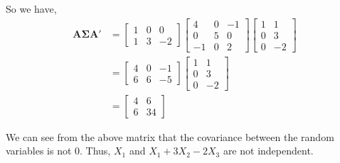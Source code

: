 \documentclass[12pt]{article}\usepackage[]{graphicx}\usepackage[]{color}
\newenvironment{problem}[2][Problem]{\begin{trivlist}
\item[\hskip \labelsep {\bfseries #1}\hskip \labelsep {\bfseries #2.}]}{\end{trivlist}}
\newcommand{\vct}{\mathbf}
\begin{document}
\begin{enumerate}[a)]
So we have,
\begin{align*}
\vct{A}\vct{\Sigma}\vct{A}' &= \begin{bmatrix} 1 & 0 & 0 \\ 1 & 3 & -2\end{bmatrix} \begin{bmatrix} 4 & 0 & -1 \\ 0 & 5 & 0 \\ -1 & 0 & 2 \end{bmatrix} \begin{bmatrix} 1 & 1 \\ 0 & 3 \\ 0 & -2\end{bmatrix}\\
&= \begin{bmatrix} 4 & 0 & -1 \\ 6 & 6 & -5\end{bmatrix} \begin{bmatrix} 1 & 1 \\ 0 & 3 \\ 0 & -2\end{bmatrix}\\
&= \begin{bmatrix} 4 & 6 \\ 6 & 34 \end{bmatrix}
\end{align*}

We can see from the above matrix that the covariance between the random variables is not 0. Thus, $X_1$ and $X_1 + 3X_2 - 2X_3$ are not independent.

\end{enumerate}


\begin{problem}{4.7}
\end{problem}
\end{document}
